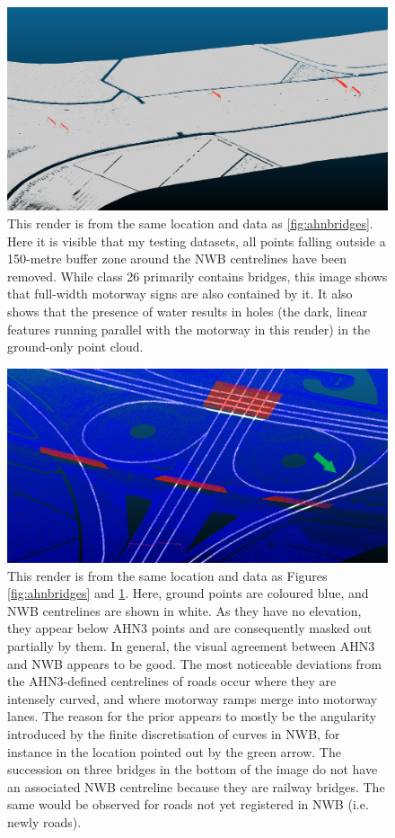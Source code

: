 \begin{figure}[h!]
    \centering
    \includegraphics[width=\linewidth]{p2/figs/ahn_sample_02.png} 
    \caption{This render is from the same location and data as \ref{fig:ahnbridges}. Here it is visible that my testing datasets, all points falling outside a 150-metre buffer zone around the NWB centrelines have been removed. While class 26 primarily contains bridges, this image shows that full-width motorway signs are also contained by it. It also shows that the presence of water results in holes (the dark, linear features running parallel with the motorway in this render) in the ground-only point cloud.}
    \label{fig:ahnsigns}
\end{figure}
\begin{figure}[h!]
    \centering
    \includegraphics[width=\linewidth]{p2/figs/ahn_sample_04_a.png} 
    \caption{This render is from the same location and data as Figures \ref{fig:ahnbridges} and \ref{fig:ahnsigns}. Here, ground points are coloured blue, and NWB centrelines are shown in white. As they have no elevation, they appear below AHN3 points and are consequently masked out partially by them. In general, the visual agreement between AHN3 and NWB appears to be good. The most noticeable deviations from the AHN3-defined centrelines of roads occur where they are intensely curved, and where motorway ramps merge into motorway lanes. The reason for the prior appears to mostly be the angularity introduced by the finite discretisation of curves in NWB, for instance in the location pointed out by the green arrow. The succession on three bridges in the bottom of the image do not have an associated NWB centreline because they are railway bridges. The same would be observed for roads not yet registered in NWB (i.e. newly roads).}
    \label{fig:ahnnwb}
\end{figure}
